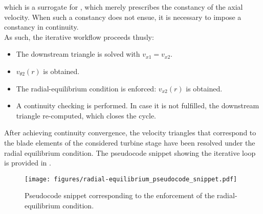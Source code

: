 which is a surrogate for , which merely prescribes the constancy of the axial velocity. When such a constancy does not ensue, it is necessary to impose a constancy in continuity.\\
As such, the iterative workflow proceeds thusly:
\begin{itemize}
	\item{The downstream triangle is solved with $v_{x1}=v_{x2}$.}
	\item{$v_{\theta2}\left(r\right)$ is obtained.}
	\item{The radial-equilibrium condition is enforced: $v_{x2}\left(r\right)$ is obtained.}
	\item{A continuity checking is performed. In case it is not fulfilled, the downstream triangle re-computed, which closes the cycle.}
\end{itemize}
After achieving continuity convergence, the velocity triangles that correspond to the blade elements of the considered turbine stage have been resolved under the radial equilibrium condition. The pseudocode snippet showing the iterative loop is provided in .
\begin{figure}[h!]
	\texttt{[image: figures/radial-equilibrium\_pseudocode\_snippet.pdf]}
	\caption{Pseudocode snippet corresponding to the enforcement of the radial-equilibrium condition.}
	\label{fig:radial-equilibrium_pseudocode_snippet}
\end{figure}